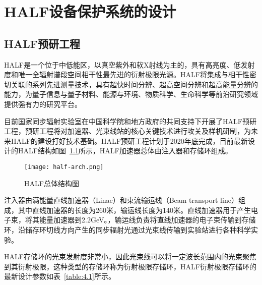 
\chapter{HALF设备保护系统的设计}

\section{HALF预研工程}

HALF是一个位于中低能区，以真空紫外和软X射线为主的，具有高亮度、低发射度和唯一全辐射谱段空间相干性最先进的衍射极限光源。HALF将集成与相干性密切关联的系列先进测量技术，具有超快时间分辨、超高空间分辨和超高能量分辨的能力，为量子信息与量子材料、能源与环境、物质科学、生命科学等前沿研究领域提供强有力的研究平台。

目前国家同步辐射实验室在中国科学院和地方政府的共同支持下开展了HALF预研工程，预研工程将对加速器、光束线站的核心关键技术进行攻关及样机研制，为未来HALF的建设打好技术基础。HALF预研工程计划于2020年底完成，目前最新设计的HALF结构如图~\ref{fig:half-arch}所示，HALF加速器总体由注入器和存储环组成。

\begin{figure}[!htb]
	\centering
	\texttt{[image: half-arch.png]}
	\caption{HALF总体结构图}
	\label{fig:half-arch}
\end{figure}

注入器由满能量直线加速器（Linac）和束流输运线（Beam transport line）组成，其中直线加速器的长度为260米，输运线长度为140米。直线加速器用于产生电子束，将其能量加速器到2.2GeV。，输运线负责将直线加速器的电子束传输到存储环，沿储存环切线方向产生的同步辐射光通过光束线传输到实验站进行各种科学实验。

HALF存储环的光束发射度非常小，因此光束线可以将一定波长范围内的光束聚焦到其衍射极限，这种类型的存储环称为衍射极限存储环，HALF衍射极限存储环的最新设计参数如表~\ref{table:4.1}所示。

